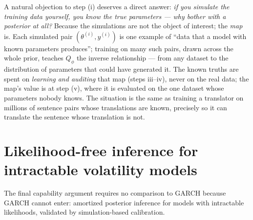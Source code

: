 \documentclass[11pt]{article}
\theoremstyle{remark}
\begin{document}
\medskip
A natural objection to step (i) deserves a direct answer: \emph{if you
simulate the training data yourself, you know the true parameters ---
why bother with a posterior at all?} Because the simulations are not
the object of interest; the \emph{map} is. Each simulated pair
$(\theta^{(i)}, y^{(i)})$ is one example of ``data that a model with
known parameters produces''; training on many such pairs, drawn across
the whole prior, teaches $Q_\phi$ the inverse relationship --- from any
dataset to the distribution of parameters that could have generated it.
The known truths are spent on \emph{learning and auditing} that map
(steps iii--iv), never on the real data; the map's value is at step
(v), where it is evaluated on the one dataset whose parameters nobody
knows. The situation is the same as training a translator on millions
of sentence pairs whose translations are known, precisely so it can
translate the sentence whose translation is not.


\section{Likelihood-free inference for intractable volatility models}
\label{sec:sbc}

The final capability argument requires no comparison to GARCH because
GARCH cannot enter: amortized posterior inference for models with
intractable likelihoods, validated by simulation-based calibration.
\end{document}
